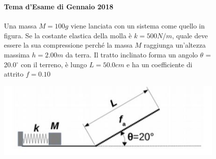\begin{figure}[h]
\textbf{Tema d'Esame di Gennaio 2018}\\ \\
Una massa $M = 100 g$ viene lanciata con un sistema come quello in figura. Se la costante elastica della molla è $k = 500 N/m$, quale deve
essere la sua compressione perché la massa $M$ raggiunga un’altezza massima
$h = 2.00 m$ da terra. Il tratto inclinato forma un angolo $\theta$ = 20.0$^{\circ}$ con il terreno, è lungo $L = 50.0 cm$ e ha un coefficiente di attrito $f = 0.10$
\\
	\begin{center}
		\includegraphics[scale=0.8]{ES2/GEN022018.jpg}
	\end{center}
\end{figure}